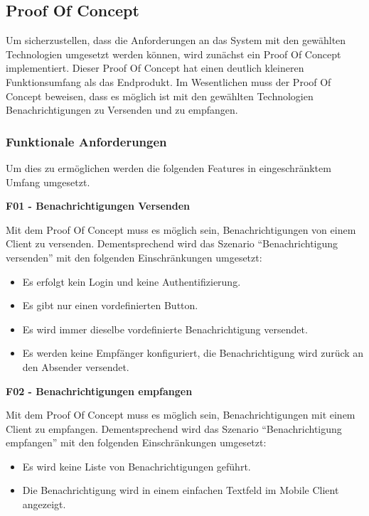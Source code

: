 \subsection{Proof Of Concept}\label{subsec:poc}

Um sicherzustellen, dass die Anforderungen an das System mit den gewählten Technologien umgesetzt werden können, wird zunächst ein Proof Of Concept implementiert.
Dieser Proof Of Concept hat einen deutlich kleineren Funktionsumfang als das Endprodukt.
Im Wesentlichen muss der Proof Of Concept beweisen, dass es möglich ist mit den gewählten Technologien Benachrichtigungen zu Versenden und zu empfangen.

\subsubsection{Funktionale Anforderungen}

Um dies zu ermöglichen werden die folgenden Features in eingeschränktem Umfang umgesetzt.

\textbf{F01 - Benachrichtigungen Versenden}

Mit dem Proof Of Concept muss es möglich sein, Benachrichtigungen von einem Client zu versenden.
Dementsprechend wird das Szenario ``Benachrichtigung versenden'' mit den folgenden Einschränkungen umgesetzt:

\begin{itemize}
    \item Es erfolgt kein Login und keine Authentifizierung.
    \item Es gibt nur einen vordefinierten Button.
    \item Es wird immer dieselbe vordefinierte Benachrichtigung versendet.
    \item Es werden keine Empfänger konfiguriert, die Benachrichtigung wird zurück an den Absender versendet.
\end{itemize}


\textbf{F02 - Benachrichtigungen empfangen}

Mit dem Proof Of Concept muss es möglich sein, Benachrichtigungen mit einem Client zu empfangen.
Dementsprechend wird das Szenario ``Benachrichtigung empfangen'' mit den folgenden Einschränkungen umgesetzt:

\begin{itemize}
    \item Es wird keine Liste von Benachrichtigungen geführt.
    \item Die Benachrichtigung wird in einem einfachen Textfeld im Mobile Client angezeigt.
\end{itemize}


